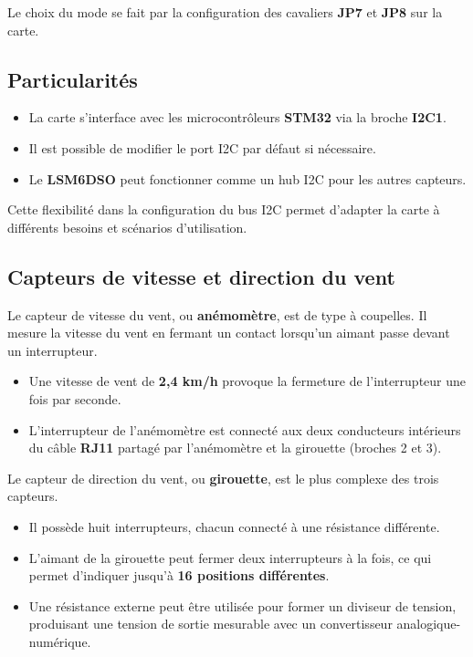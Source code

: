 \documentclass[12pt]{article}
\begin{document}
Le choix du mode se fait par la configuration des cavaliers \textbf{JP7} et \textbf{JP8} sur la carte.

\subsection*{Particularités}

\begin{itemize}
    \item La carte s'interface avec les microcontrôleurs \textbf{STM32} via la broche \textbf{I2C1}.
    \item Il est possible de modifier le port I2C par défaut si nécessaire.
    \item Le \textbf{LSM6DSO} peut fonctionner comme un hub I2C pour les autres capteurs.
\end{itemize}

Cette flexibilité dans la configuration du bus I2C permet d'adapter la carte à différents besoins et scénarios d'utilisation.

\subsection{Capteurs de vitesse et direction du vent}
Le capteur de vitesse du vent, ou \textbf{anémomètre}, est de type à coupelles. Il mesure la vitesse du vent en fermant un contact lorsqu'un aimant passe devant un interrupteur. 
\begin{itemize}
    \item Une vitesse de vent de \textbf{2,4 km/h} provoque la fermeture de l'interrupteur une fois par seconde.
    \item L'interrupteur de l'anémomètre est connecté aux deux conducteurs intérieurs du câble \textbf{RJ11} partagé par l'anémomètre et la girouette (broches 2 et 3).
\end{itemize}

Le capteur de direction du vent, ou \textbf{girouette}, est le plus complexe des trois capteurs. 
\begin{itemize}
    \item Il possède huit interrupteurs, chacun connecté à une résistance différente.
    \item L'aimant de la girouette peut fermer deux interrupteurs à la fois, ce qui permet d'indiquer jusqu'à \textbf{16 positions différentes}.
    \item Une résistance externe peut être utilisée pour former un diviseur de tension, produisant une tension de sortie mesurable avec un convertisseur analogique-numérique.
\end{itemize}
\end{document}
